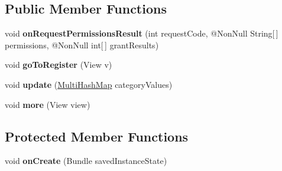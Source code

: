 \subsection*{Public Member Functions}
\begin{DoxyCompactItemize}
\item 
void {\bfseries on\+Request\+Permissions\+Result} (int request\+Code, @Non\+Null String\mbox{[}$\,$\mbox{]} permissions, @Non\+Null int\mbox{[}$\,$\mbox{]} grant\+Results)\hypertarget{classcom_1_1example_1_1sebastian_1_1tindertp_1_1InterestsActivity_af67fb164fcb58c8b98bcba699994705a}{}\label{classcom_1_1example_1_1sebastian_1_1tindertp_1_1InterestsActivity_af67fb164fcb58c8b98bcba699994705a}

\item 
void {\bfseries go\+To\+Register} (View v)\hypertarget{classcom_1_1example_1_1sebastian_1_1tindertp_1_1InterestsActivity_ace9e14948bd77770f6319b9101a4ae25}{}\label{classcom_1_1example_1_1sebastian_1_1tindertp_1_1InterestsActivity_ace9e14948bd77770f6319b9101a4ae25}

\item 
void {\bfseries update} (\hyperlink{classcom_1_1example_1_1sebastian_1_1tindertp_1_1commonTools_1_1MultiHashMap}{Multi\+Hash\+Map} category\+Values)\hypertarget{classcom_1_1example_1_1sebastian_1_1tindertp_1_1InterestsActivity_a7cf164f5a729aa58dec5480868d24aa6}{}\label{classcom_1_1example_1_1sebastian_1_1tindertp_1_1InterestsActivity_a7cf164f5a729aa58dec5480868d24aa6}

\item 
void {\bfseries more} (View view)\hypertarget{classcom_1_1example_1_1sebastian_1_1tindertp_1_1InterestsActivity_a7594c382ddd691463c3e2f2b8b98ecf4}{}\label{classcom_1_1example_1_1sebastian_1_1tindertp_1_1InterestsActivity_a7594c382ddd691463c3e2f2b8b98ecf4}

\end{DoxyCompactItemize}
\subsection*{Protected Member Functions}
\begin{DoxyCompactItemize}
\item 
void {\bfseries on\+Create} (Bundle saved\+Instance\+State)\hypertarget{classcom_1_1example_1_1sebastian_1_1tindertp_1_1InterestsActivity_a8170231a6d7ca77c0d5eab6d9b778c5a}{}\label{classcom_1_1example_1_1sebastian_1_1tindertp_1_1InterestsActivity_a8170231a6d7ca77c0d5eab6d9b778c5a}

\end{DoxyCompactItemize}
